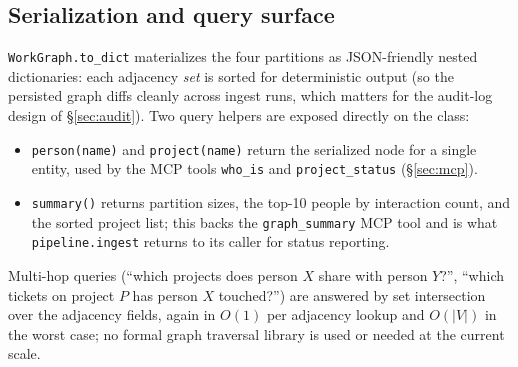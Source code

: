 \subsection{Serialization and query surface}
\label{sec:workgraph-queries}

\texttt{WorkGraph.to\_dict} materializes the four partitions as JSON-friendly nested dictionaries: each adjacency \emph{set} is sorted for deterministic output (so the persisted graph diffs cleanly across ingest runs, which matters for the audit-log design of \S\ref{sec:audit}). Two query helpers are exposed directly on the class:
\begin{itemize}
  \setlength\itemsep{0.15em}
  \item \texttt{person(name)} and \texttt{project(name)} return the serialized node for a single entity, used by the MCP tools \texttt{who\_is} and \texttt{project\_status} (\S\ref{sec:mcp}).
  \item \texttt{summary()} returns partition sizes, the top-10 people by interaction count, and the sorted project list; this backs the \texttt{graph\_summary} MCP tool and is what \texttt{pipeline.ingest} returns to its caller for status reporting.
\end{itemize}
Multi-hop queries (``which projects does person $X$ share with person $Y$?'', ``which tickets on project $P$ has person $X$ touched?'') are answered by set intersection over the adjacency fields, again in $O(1)$ per adjacency lookup and $O(|V|)$ in the worst case; no formal graph traversal library is used or needed at the current scale.

